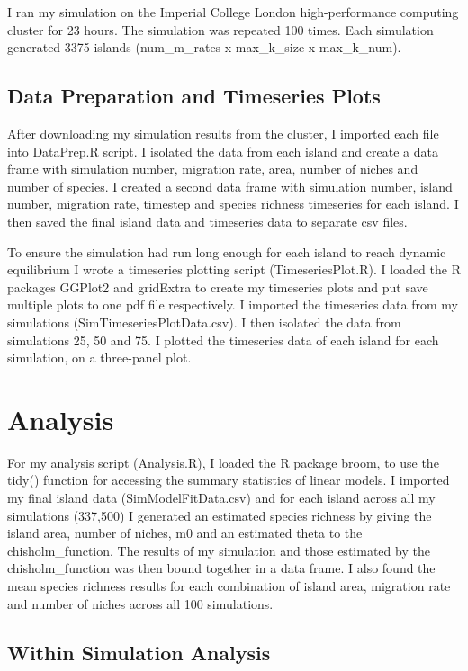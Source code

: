 \documentclass{article}
\begin{document}
I ran my simulation on the Imperial College London high-performance computing cluster for 23 hours. The simulation was repeated 100 times. Each simulation generated 3375 islands (num\_m\_rates x max\_k\_size x max\_k\_num). 

\subsection{Data Preparation and Timeseries Plots}
After downloading my simulation results from the cluster, I imported each file into DataPrep.R script. I isolated the data from each island and create a data frame with simulation number, migration rate, area, number of niches and number of species. I created a second data frame with simulation number, island number, migration rate, timestep and species richness timeseries for each island. I then saved the final island data and timeseries data to separate csv files. \bigskip

To ensure the simulation had run long enough for each island to reach dynamic equilibrium I wrote a timeseries plotting script (TimeseriesPlot.R). I loaded the R packages GGPlot2 and gridExtra to create my timeseries plots and put save multiple plots to one pdf file respectively. I imported the timeseries data from my simulations (SimTimeseriesPlotData.csv). I then isolated the data from simulations 25, 50 and 75. I plotted the timeseries data of each island for each simulation, on a three-panel plot.  

\section{Analysis}
For my analysis script (Analysis.R), I loaded the R package broom, to use the tidy() function for accessing the summary statistics of linear models. I imported my final island data (SimModelFitData.csv) and for each island across all my simulations (337,500) I generated an estimated species richness by giving the island area, number of niches, m0 and an estimated theta to the chisholm\_function. The results of my simulation and those estimated by the chisholm\_function was then bound together in a data frame. I also found the mean species richness results for each combination of island area, migration rate and number of niches across all 100 simulations.
  
\subsection{Within Simulation Analysis}
\end{document}
